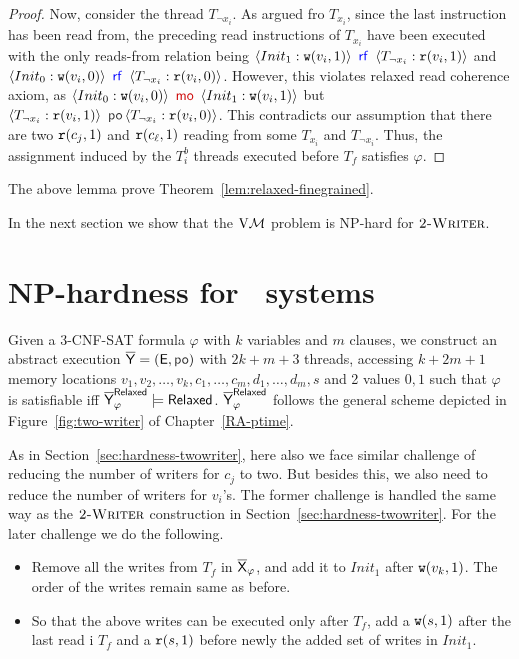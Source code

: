 \begin{proof}
    Now, consider the thread $T_{\neg x_i}$. As argued fro $T_{x_i}$, since the last instruction has been read from, the preceding read instructions of $T_{x_i}$ have been executed with the only reads-from relation being 
    $\tuple{Init_1: \wt(v_i, 1)}~\rf~\tuple{T_{\neg x_i}: \rd(v_i, 1)}$ and $\tuple{Init_0: \wt(v_i, 0)}~\rf~\tuple{T_{\neg x_i}: \rd(v_i, 0)}$. 
    However, this violates relaxed read coherence axiom, as $\tuple{Init_0: \wt(v_i, 0)} ~\mo~\tuple{Init_1: \wt(v_i, 1)}$ but $\tuple{T_{\neg x_i}: \rd(v_i, 1)}~\po~\\ \tuple{T_{\neg x_i}: \rd(v_i, 0)}$. 
    This contradicts our assumption that there are two $\mathtt{r}(c_j, 1)$ and $\mathtt{r}(c_\ell, 1)$ reading from some $T_{x_i}$ and $T_{\neg x_i}$. 
    Thus, the assignment induced by the $T_i^b$ threads executed before $T_f$ satisfies $\varphi$.
\end{proof}

The above lemma prove Theorem~\ref{lem:relaxed-finegrained}.

In the next section we show that the $\mathrm{V}\mathcal{M}$ problem is NP-hard for $\textsc{2-Writer}$. 

\section{NP-hardness for \twowriter\ systems}
\label{sec:np-relaxed}
Given a 3-CNF-SAT formula $\varphi$ with $k$ variables and $m$ clauses, we construct an abstract execution $\ypartial=(\E, \po)$ with $2k+m+3$ threads, accessing $k+2m+1$ memory locations $v_1, v_2, \dots, v_k, c_1, \dots, c_m, d_1, \dots, d_m, s$ and 2 values $0, 1$ such that $\varphi$ is satisfiable iff $\overline{\mathsf{\color{black}Y}}_\varphi^{\mathsf{Relaxed}}  \models \mathsf{Relaxed}$.
$\overline{\mathsf{\color{black}Y}}_\varphi^{\mathsf{Relaxed}}$ follows the general scheme depicted in Figure~\ref{fig:two-writer} of Chapter~\ref{RA-ptime}.

As in Section~\ref{sec:hardness-twowriter}, here also we face similar challenge of reducing the number of writers for $c_j$ to two. But besides this, we also need to reduce the number of writers for $v_i$'s. The former challenge is handled the same way as the $\textsc{2-Writer}$ construction in Section~\ref{sec:hardness-twowriter}. For the later challenge we do the following.
\begin{itemize}
 \item Remove all the writes from $T_f$ in $\overline{\mathsf{\color{black}X}}_{\varphi}$, and add it to $Init_1$ after $\mathtt{w}(v_k,1)$. The order of the writes remain same as before.
 
\item So that the above writes can be executed only after $T_f$, add a $\mathtt{w}(s,1)$ after the last read i $T_f$ and a $\mathtt{r}(s,1)$ before newly the added  set of writes in $Init_1$.
\end{itemize}

